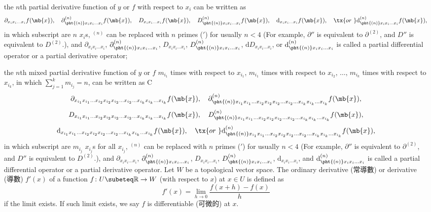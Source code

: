 \documentclass[a4paper,12pt]{report}
\begin{document}
\begin{itemize}
\begin{itemize}
the $n$th partial derivative function of $y$ or $f$ with respect to $x_i$ can be written as
\[\partial_{x_ix_i\dots  x_i}f(\mb{x}),\quad\partial^{(n)}_{\pht{(n)}x_ix_i\dots  x_i}f(\mb{x}),\quad D_{x_ix_i\dots  x_i}f(\mb{x}),\quad D^{(n)}_{\pht{(n)}x_ix_i\dots  x_i}f(\mb{x}),\quad \mathrm{d}_{x_ix_i\dots  x_i}f(\mb{x}),\quad\tx{or\ }\mathrm{d}^{(n)}_{\pht{(n)}x_ix_i\dots  x_i}f(\mb{x}),\]
in which subscript are $n$ $x_i$s, $^{(n)}$ can be replaced with $n$ primes ($'$) for usually $n<4$ (For example, $\partial''$ is equivalent to $\partial^{(2)}$, and $D''$ is equivalent to $D^{(2)}$.), and $\partial_{x_ix_i\dots  x_i}$, $\partial^{(n)}_{\pht{(n)}x_ix_i\dots  x_i}$, $D_{x_ix_i\dots  x_i}$, $D^{(n)}_{\pht{(n)}x_ix_i\dots  x_i}$, $\mathrm{d}D_{x_ix_i\dots  x_i}$, or $\mathrm{d}^{(n)}_{\pht{(n)}x_ix_i\dots  x_i}$ is called a partial differential operator or a partial derivative operator;

the $n$th mixed partial derivative function of $y$ or $f$ $m_{i_1}$ times with respect to $x_{i_1}$, $m_{i_1}$ times with respect to $x_{i_2}$, $\dots $, $m_{i_k}$ times with respect to $x_{i_k}$, in which $\sum_{j=1}^km_{i_j}=n$, can be written as
C\[\partial_{x_{i_1}x_{i_1}\dots  x_{i_2}x_{i_2}x_{i_2}\dots  x_{i_2}\dots  x_{i_k}x_{i_k}\dots  x_{i_k}}f(\mb{x}),\quad\partial^{(n)}_{\pht{(n)}x_{i_1}x_{i_1}\dots  x_{i_2}x_{i_2}x_{i_2}\dots  x_{i_2}\dots  x_{i_k}x_{i_k}\dots  x_{i_k}}f(\mb{x}),\]
\[ D_{x_{i_1}x_{i_1}\dots  x_{i_2}x_{i_2}x_{i_2}\dots  x_{i_2}\dots  x_{i_k}x_{i_k}\dots  x_{i_k}}f(\mb{x}),\quad D^{(n)}_{\pht{(n)}x_{i_1}x_{i_1}\dots  x_{i_2}x_{i_2}x_{i_2}\dots  x_{i_2}\dots  x_{i_k}x_{i_k}\dots  x_{i_k}}f(\mb{x}),\]
\[ \mathrm{d}_{x_{i_1}x_{i_1}\dots  x_{i_2}x_{i_2}x_{i_2}\dots  x_{i_2}\dots  x_{i_k}x_{i_k}\dots  x_{i_k}}f(\mb{x}),\quad\tx{or\ }\mathrm{d}^{(n)}_{\pht{(n)}x_{i_1}x_{i_1}\dots  x_{i_2}x_{i_2}x_{i_2}\dots  x_{i_2}\dots  x_{i_k}x_{i_k}\dots  x_{i_k}}f(\mb{x}),\]
in which subscript are $m_{i_j}$ $x_{i_j}$s for all $x_{i_j}$, $^{(n)}$ can be replaced with $n$ primes ($'$) for usually $n<4$ (For example, $\partial''$ is equivalent to $\partial^{(2)}$, and $D''$ is equivalent to $D^{(2)}$.), and $\partial_{x_ix_i\dots  x_i}$, $\partial^{(n)}_{\pht{(n)}x_ix_i\dots  x_i}$, $D_{x_ix_i\dots  x_i}$, $D^{(n)}_{\pht{(n)}x_ix_i\dots  x_i}$, $\mathrm{d}_{x_ix_i\dots  x_i}$, and $\mathrm{d}^{(n)}_{\pht{(n)}x_ix_i\dots  x_i}$ is called a partial differential operator or a partial derivative operator.
Let $W$ be a topological vector space. The ordinary derivative (常導數) or derivative (導數) $f'(x)$ of a function $f\colon U\subeteq\mathbb{R}\to W$ (with respect to $x$) at $x\in U$ is defined as
\[f'(x)=\lim_{h\to 0}\frac{f(x+h)-f(x)}{h}\]
if the limit exists. If such limit exists, we say $f$ is differentiable (可微的) at $x$.


\end{itemize}
\end{itemize}
\end{document}
